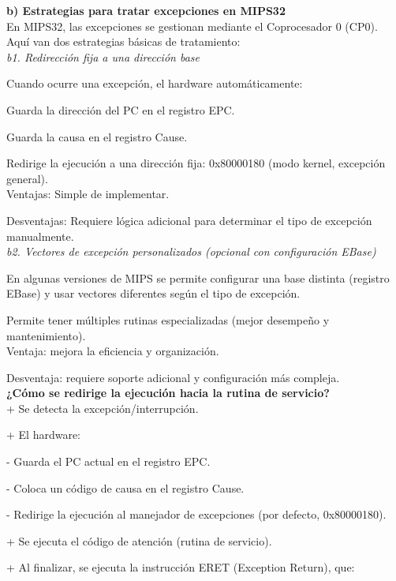 \documentclass[]{article}
\begin{document}
\textbf{b) Estrategias para tratar excepciones en MIPS32} \\

En MIPS32, las excepciones se gestionan mediante el Coprocesador 0 (CP0). Aquí van dos estrategias básicas de tratamiento: \\

\textit{b1. Redirección fija a una dirección base}

Cuando ocurre una excepción, el hardware automáticamente:

Guarda la dirección del PC en el registro EPC.

Guarda la causa en el registro Cause.

Redirige la ejecución a una dirección fija: 0x80000180 (modo kernel, excepción general). \\

Ventajas: Simple de implementar.

Desventajas: Requiere lógica adicional para determinar el tipo de excepción manualmente. \\

\textit{b2. Vectores de excepción personalizados (opcional con configuración EBase)}

En algunas versiones de MIPS se permite configurar una base distinta (registro EBase) y usar vectores diferentes según el tipo de excepción.

Permite tener múltiples rutinas especializadas (mejor desempeño y mantenimiento). \\

Ventaja: mejora la eficiencia y organización.

Desventaja: requiere soporte adicional y configuración más compleja. \\

\textbf{¿Cómo se redirige la ejecución hacia la rutina de servicio?} \\

+ Se detecta la excepción/interrupción.

+ El hardware:

- Guarda el PC actual en el registro EPC.

- Coloca un código de causa en el registro Cause.

- Redirige la ejecución al manejador de excepciones (por defecto, 0x80000180).

+ Se ejecuta el código de atención (rutina de servicio).

+ Al finalizar, se ejecuta la instrucción ERET (Exception Return), que:
\end{document}
